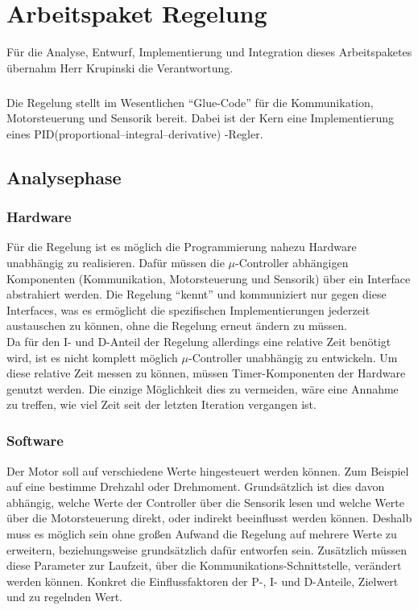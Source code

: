 \graphicspath{{./regulation/}}
\chapter{Arbeitspaket Regelung}
Für die Analyse, Entwurf, Implementierung und Integration dieses Arbeitspaketes übernahm Herr Krupinski die Verantwortung.
\paragraph{}
Die Regelung stellt im Wesentlichen ``Glue-Code'' für die Kommunikation, Motorsteuerung und Sensorik bereit. Dabei ist der Kern eine Implementierung eines PID(proportional–integral–derivative) -Regler.
\section{Analysephase}
\subsection{Hardware}
Für die Regelung ist es möglich die Programmierung nahezu Hardware unabhängig zu realisieren. Dafür müssen die $\mu$-Controller abhängigen Komponenten (Kommunikation, Motorsteuerung und Sensorik) über ein Interface abstrahiert werden. Die Regelung ``kennt'' und kommuniziert nur gegen diese Interfaces, was es ermöglicht die spezifischen Implementierungen jederzeit austauschen zu können, ohne die Regelung erneut ändern zu müssen.\\
Da für den I- und D-Anteil der Regelung allerdings eine relative Zeit benötigt wird, ist es nicht komplett möglich $\mu$-Controller unabhängig zu entwickeln. Um diese relative Zeit messen zu können, müssen Timer-Komponenten der Hardware genutzt werden. Die einzige Möglichkeit dies zu vermeiden, wäre eine Annahme zu treffen, wie viel Zeit seit der letzten Iteration vergangen ist.
\paragraph{}
\subsection{Software}
Der Motor soll auf verschiedene Werte hingesteuert werden können. Zum Beispiel auf eine bestimme Drehzahl oder Drehmoment. Grundsätzlich ist dies davon abhängig, welche Werte der Controller über die Sensorik lesen und welche Werte über die Motorsteuerung direkt, oder indirekt beeinflusst werden können. Deshalb muss es möglich sein ohne großen Aufwand die Regelung auf mehrere Werte zu erweitern, beziehungsweise grundsätzlich dafür entworfen sein. Zusätzlich müssen diese Parameter zur Laufzeit, über die Kommunikations-Schnittstelle, verändert werden können. Konkret die Einflussfaktoren der P-, I- und D-Anteile, Zielwert und zu regelnden Wert.

